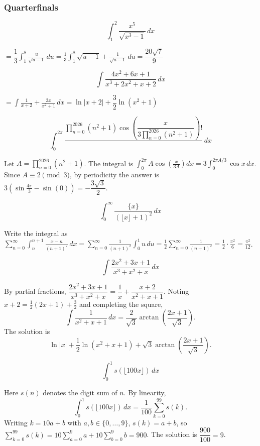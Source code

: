 \subsubsection*{Quarterfinals}
\begin{questions}

\question \[ \int_1^2 \frac{x^5}{\sqrt{x^3-1}}\, dx \]
\begin{solution}
$= \dfrac{1}{3}\displaystyle\int_1^8 \frac{u}{\sqrt{u-1}}\, du = \frac{1}{3}\int_1^8 \sqrt{u-1}+\frac{1}{\sqrt{u-1}}\, du = \dfrac{20\sqrt7}{9}$
\end{solution}

\question \[ \int \frac{4x^2+6x+1}{x^3+2x^2+x+2}\, dx \]
\begin{solution}
$= \displaystyle\int \frac{1}{x+2}+\frac{3x}{x^2+1}\, dx = \ln|x+2|+\dfrac{3}{2}\ln(x^2+1)$
\end{solution}

\question \[ \int_0^{2\pi} \frac{\displaystyle\prod_{n=0}^{2026}(n^2+1)\cos\left(\dfrac{x}{3\prod_{n=0}^{2026}(n^2+1)}\right)!}{}\, dx \]
\begin{solution}
Let $A=\prod_{n=0}^{2026}(n^2+1)$. The integral is $\int_0^{2\pi} A\cos\left(\tfrac{x}{3A}\right) dx = 3\int_0^{2\pi A/3}\cos x\, dx$. Since $A\equiv 2\pmod 3$, by periodicity the answer is $3\left(\sin\tfrac{4\pi}{3}-\sin(0)\right) = -\dfrac{3\sqrt3}{2}$.
\end{solution}

\question \[ \int_0^\infty \frac{\{x\}}{(\lfloor x\rfloor+1)^2}\, dx \]
\begin{solution}
Write the integral as $\displaystyle\sum_{n=0}^\infty \int_n^{n+1} \frac{x-n}{(n+1)^2}\, dx = \sum_{n=0}^\infty \frac{1}{(n+1)^2}\int_0^1 u\, du = \frac{1}{2}\sum_{n=0}^\infty \frac{1}{(n+1)^2} = \frac{1}{2}\cdot\frac{\pi^2}{6} = \frac{\pi^2}{12}$.
\end{solution}

\question \[ \int \frac{2x^2+3x+1}{x^3+x^2+x}\, dx \]
\begin{solution}
By partial fractions, $\dfrac{2x^2+3x+1}{x^3+x^2+x} = \dfrac{1}{x}+\dfrac{x+2}{x^2+x+1}$. Noting $x+2=\tfrac{1}{2}(2x+1)+\tfrac{3}{2}$ and completing the square,
\[ \int \frac{1}{x^2+x+1}\, dx = \frac{2}{\sqrt3}\arctan\left(\frac{2x+1}{\sqrt3}\right). \]
The solution is
\[ \ln|x| + \frac{1}{2}\ln(x^2+x+1) + \sqrt3\arctan\left(\frac{2x+1}{\sqrt3}\right). \]
\end{solution}

\question \[ \int_0^1 s(\lfloor 100x\rfloor)\, dx \]
\begin{solution}
Here $s(n)$ denotes the digit sum of $n$. By linearity,
\[ \int_0^1 s(\lfloor 100x\rfloor)\, dx = \frac{1}{100}\sum_{k=0}^{99} s(k). \]
Writing $k=10a+b$ with $a,b\in\{0,\dots,9\}$, $s(k)=a+b$, so $\sum_{k=0}^{99}s(k)=10\sum_{a=0}^9 a+10\sum_{b=0}^9 b=900$. The solution is $\dfrac{900}{100}=9$.
\end{solution}


\end{questions}
